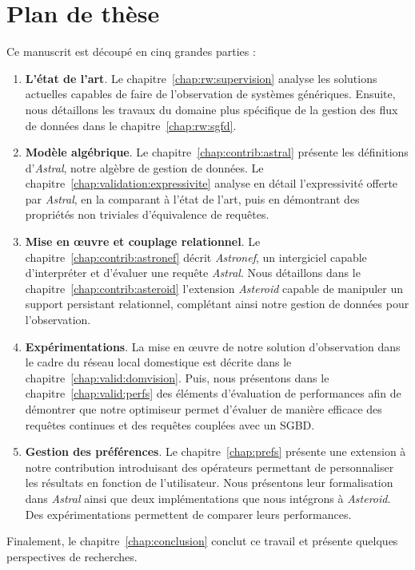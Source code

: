 \section{Plan de thèse}\label{sec:intro:plan}
Ce manuscrit est découpé en cinq grandes parties :
\begin{enumerate}
\item \textbf{L'état de l'art}. Le chapitre~\ref{chap:rw:supervision} analyse les solutions actuelles capables de faire de l'observation de systèmes génériques. Ensuite, nous détaillons les travaux du domaine plus spécifique de la gestion des flux de données dans le chapitre~\ref{chap:rw:sgfd}.
\item \textbf{Modèle algébrique}. Le chapitre~\ref{chap:contrib:astral} présente les définitions d'\textit{Astral}, notre algèbre de gestion de données. Le chapitre~\ref{chap:validation:expressivite} analyse en détail l'expressivité offerte par \textit{Astral}, en la comparant à l'état de l'art, puis en démontrant des propriétés non triviales d'équivalence de requêtes. 
\item \textbf{Mise en œuvre et couplage relationnel}. Le chapitre~\ref{chap:contrib:astronef} décrit \textit{Astronef}, un intergiciel capable d'interpréter et d'évaluer une requête \textit{Astral}. Nous détaillons dans le chapitre~\ref{chap:contrib:asteroid} l'extension \textit{Asteroid} capable de manipuler un support persistant relationnel, complétant ainsi notre gestion de données pour l'observation.
\item \textbf{Expérimentations}. La mise en œuvre de notre solution d'observation dans le cadre du réseau local domestique est décrite dans le chapitre~\ref{chap:valid:domvision}. Puis, nous présentons dans le chapitre~\ref{chap:valid:perfs} des éléments d'évaluation de performances afin de démontrer que notre optimiseur permet d'évaluer de manière efficace des requêtes continues et des requêtes couplées avec un SGBD.
\item \textbf{Gestion des préférences}. Le chapitre~\ref{chap:prefs} présente une extension à notre contribution introduisant des opérateurs permettant de personnaliser les résultats en fonction de l'utilisateur. Nous présentons leur formalisation dans \textit{Astral} ainsi que deux implémentations que nous intégrons à \textit{Asteroid}. Des expérimentations permettent de comparer leurs performances.
\end{enumerate}

Finalement, le chapitre~\ref{chap:conclusion} conclut ce travail et présente quelques perspectives de recherches.
